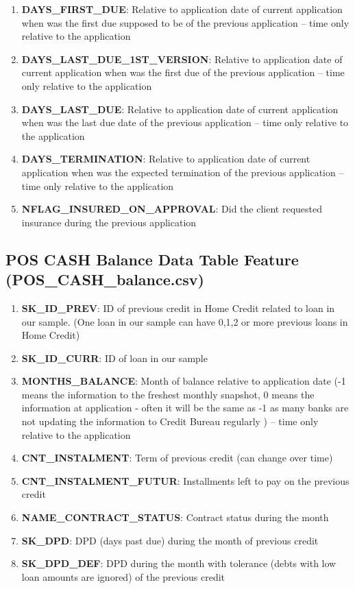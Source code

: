 \documentclass[12pt, letterpaper]{article}
\begin{document}
\begin{appendices}
\begin{enumerate}
  \item \textbf{DAYS_FIRST_DUE}: Relative to application date of current application when was the first due supposed to be of the previous application -- time only relative to the application
  \item \textbf{DAYS_LAST_DUE_1ST_VERSION}: Relative to application date of current application when was the first due of the previous application -- time only relative to the application
  \item \textbf{DAYS_LAST_DUE}: Relative to application date of current application when was the last due date of the previous application -- time only relative to the application
  \item \textbf{DAYS_TERMINATION}: Relative to application date of current application when was the expected termination of the previous application -- time only relative to the application
  \item \textbf{NFLAG_INSURED_ON_APPROVAL}: Did the client requested insurance during the previous application
\end{enumerate}

\subsection{POS CASH Balance Data Table Feature (POS_CASH_balance.csv)}
\begin{enumerate}
  \item \textbf{SK_ID_PREV}: ID of previous credit in Home Credit related to loan in our sample. (One loan in our sample can have 0,1,2 or more previous loans in Home Credit)
  \item \textbf{SK_ID_CURR}: ID of loan in our sample
  \item \textbf{MONTHS_BALANCE}: Month of balance relative to application date (-1 means the information to the freshest monthly snapshot, 0 means the information at application - often it will be the same as -1 as many banks are not updating the information to Credit Bureau regularly ) -- time only relative to the application
  \item \textbf{CNT_INSTALMENT}: Term of previous credit (can change over time)
  \item \textbf{CNT_INSTALMENT_FUTUR}: Installments left to pay on the previous credit
  \item \textbf{NAME_CONTRACT_STATUS}: Contract status during the month
  \item \textbf{SK_DPD}: DPD (days past due) during the month of previous credit
  \item \textbf{SK_DPD_DEF}: DPD during the month with tolerance (debts with low loan amounts are ignored) of the previous credit
\end{enumerate}


\end{appendices}
\end{document}
